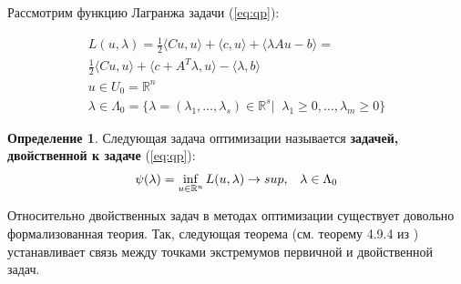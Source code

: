 \documentclass[a4paper, 12pt, titlepage]{article}
\theoremstyle{definition}
\newtheorem{SmartDefinition}{Определение}
\theoremstyle{plain}
\theoremstyle{plain}
\begin{document}
Рассмотрим функцию Лагранжа задачи (\ref{eq:qp}):

\begin{equation}
 \begin{aligned}
 L(u, \lambda) = \frac{1}{2} \langle C u, u \rangle + \langle c, u \rangle +
 \langle \lambda A u - b \rangle = \\
 \frac{1}{2} \langle C u, u \rangle +
 \langle c + A^{T} \lambda, u \rangle - \langle \lambda, b \rangle \\
 u \in U_{0} = \mathbb{R}^{n} \\
 \lambda \in \Lambda_{0} = \{\lambda = (\lambda_{1}, \ldots, \lambda_{s})
 \in \mathbb{R}^{s} | \;\; \lambda_{1} \geq 0, \ldots, \lambda_{m} \geq 0 \}
 \end{aligned}
\end{equation}

\begin{SmartDefinition}
 Следующая задача оптимизации называется \textbf{задачей, двойственной к задаче}
 (\ref{eq:qp}):
 \begin{equation}
  \begin{aligned}
   \psi(\lambda) = \operatornamewithlimits{inf}_{u \in \mathbb{R}^{n}}
   L(u, \lambda) \to sup, \;\;\; \lambda \in \Lambda_{0}
  \end{aligned}
 \end{equation}
\end{SmartDefinition}

Относительно двойственных задач в методах оптимизации существует довольно
формализованная теория. Так, следующая теорема (см. теорему 4.9.4 
из \cite{Vasilev1980}) устанавливает связь между точками экстремумов
первичной и двойственной задач.
\end{document}
